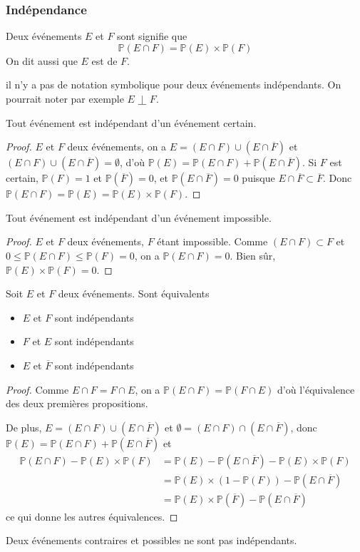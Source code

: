 \subsubsection{Indépendance}
\begin{definition}
[Indépendance]
Deux événements \(𝐸\) et \(𝐹\) sont  signifie que
\begin{equation*}
ℙ(𝐸∩𝐹)=ℙ(𝐸)×ℙ(𝐹)
\end{equation*}
On dit aussi que \(𝐸\) est  de \(𝐹\).
\end{definition}
\begin{remark}
il n'y a pas de notation symbolique pour deux événements indépendants.
On pourrait noter par exemple \(𝐸⟘𝐹\).
\end{remark}
\begin{lemma}
Tout événement est indépendant d'un événement certain.
\end{lemma}
\begin{proof}
\(𝐸\) et \(𝐹\) deux événements, on a \(𝐸=(𝐸∩𝐹)∪(𝐸∩\overline{𝐹})\) et \((𝐸∩𝐹)∪(𝐸∩\overline{𝐹})= ∅\), d'où
\(ℙ(𝐸)=ℙ(𝐸∩𝐹)+ℙ(𝐸∩\overline{𝐹})\).
Si \(𝐹\) est certain, \(ℙ(𝐹)=1\) et \(ℙ(\overline{𝐹})=0\), et \(ℙ(𝐸∩\overline{𝐹})=0\) puisque
\(𝐸∩\overline{𝐹}⊂\overline{𝐹}\).
Donc
\(ℙ(𝐸∩𝐹)=ℙ(𝐸)=ℙ(𝐸)×ℙ(𝐹)\).
\end{proof}
\begin{theorem}
Tout événement est indépendant d'un événement impossible.
\end{theorem}
\begin{proof}
\(𝐸\) et \(𝐹\) deux événements, \(𝐹\) étant impossible. Comme \((𝐸∩𝐹)⊂𝐹\) et \(0≤ℙ(𝐸∩𝐹)≤ℙ(𝐹)=0\), on a
\(ℙ(𝐸∩𝐹)=0\). Bien sûr, \(ℙ(𝐸)×ℙ(𝐹)=0\).
\end{proof}
\begin{proposition}
Soit \(𝐸\) et \(𝐹\) deux événements. Sont équivalents
\begin{itemize}
\item
\(𝐸\) et \(𝐹\) sont indépendants
\item
\(𝐹\) et \(𝐸\) sont indépendants
\item
\(𝐸\) et \(\overline{𝐹}\) sont indépendants
\end{itemize}
\end{proposition}
\begin{proof}
Comme \(𝐸∩𝐹=𝐹∩𝐸\), on a \(ℙ(𝐸∩𝐹)=ℙ(𝐹∩𝐸)\) d'où l'équivalence des deux premières propositions.

De plus, \(𝐸=(𝐸∩𝐹)∪(𝐸∩\overline{𝐹})\)
et \(∅=(𝐸∩𝐹)∩(𝐸∩\overline{𝐹})\), donc
\(ℙ(𝐸)=ℙ(𝐸∩𝐹)+ℙ(𝐸∩\overline{𝐹})\) et
\begin{align*}
ℙ(𝐸∩𝐹)-ℙ(𝐸)×ℙ(𝐹)&{}=ℙ(𝐸)-ℙ(𝐸∩\overline{𝐹})-ℙ(𝐸)×ℙ(𝐹)
\\
&{}=ℙ(𝐸)×(1-ℙ(𝐹))-ℙ(𝐸∩\overline{𝐹})
\\
&{}=ℙ(𝐸)×ℙ(\overline{𝐹})-ℙ(𝐸∩\overline{𝐹})
\end{align*}
ce qui donne les autres équivalences.
\end{proof}
\begin{example}
Deux événements contraires et possibles ne sont pas indépendants.
\end{example}
%
